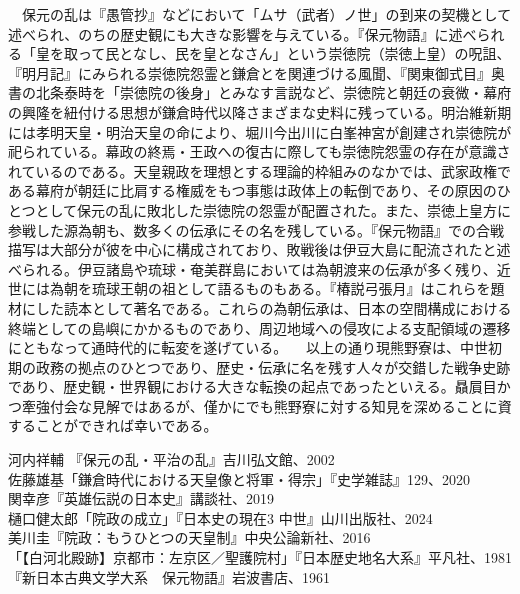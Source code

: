 　保元の乱は『愚管抄』などにおいて「ムサ（武者）ノ世」の到来の契機として述べられ、のちの歴史観にも大きな影響を与えている。『保元物語』に述べられる「皇を取って民となし、民を皇となさん」という崇徳院（崇徳上皇）の呪詛、『明月記』にみられる崇徳院怨霊と鎌倉とを関連づける風聞、『関東御式目』奥書の北条泰時を「崇徳院の後身」とみなす言説など、崇徳院と朝廷の衰微・幕府の興隆を紐付ける思想が鎌倉時代以降さまざまな史料に残っている。明治維新期には孝明天皇・明治天皇の命により、堀川今出川に白峯神宮が創建され崇徳院が祀られている。幕政の終焉・王政への復古に際しても崇徳院怨霊の存在が意識されているのである。天皇親政を理想とする理論的枠組みのなかでは、武家政権である幕府が朝廷に比肩する権威をもつ事態は政体上の転倒であり、その原因のひとつとして保元の乱に敗北した崇徳院の怨霊が配置された。また、崇徳上皇方に参戦した源為朝も、数多くの伝承にその名を残している。『保元物語』での合戦描写は大部分が彼を中心に構成されており、敗戦後は伊豆大島に配流されたと述べられる。伊豆諸島や琉球・奄美群島においては為朝渡来の伝承が多く残り、近世には為朝を琉球王朝の祖として語るものもある。『椿説弓張月』はこれらを題材にした読本として著名である。これらの為朝伝承は、日本の空間構成における終端としての島嶼にかかるものであり、周辺地域への侵攻による支配領域の遷移にともなって通時代的に転変を遂げている。
　以上の通り現熊野寮は、中世初期の政務の拠点のひとつであり、歴史・伝承に名を残す人々が交錯した戦争史跡であり、歴史観・世界観における大きな転換の起点であったといえる。贔屓目かつ牽強付会な見解ではあるが、僅かにでも熊野寮に対する知見を深めることに資することができれば幸いである。

\begin{tcolorbox}[colback=white,colframe=black,title=参考文献・引用文献]
河内祥輔 『保元の乱・平治の乱』吉川弘文館、2002\\
佐藤雄基「鎌倉時代における天皇像と将軍・得宗」『史学雑誌』129、2020\\
関幸彦『英雄伝説の日本史』講談社、2019\\
樋口健太郎「院政の成立」『日本史の現在3 中世』山川出版社、2024\\
美川圭『院政：もうひとつの天皇制』中央公論新社、2016\\
「【白河北殿跡】京都市：左京区／聖護院村」『日本歴史地名大系』平凡社、1981\\
『新日本古典文学大系　保元物語』岩波書店、1961
\end{tcolorbox}